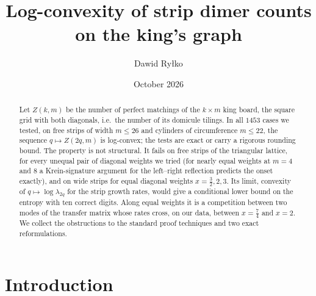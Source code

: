 \documentclass[11pt]{amsart}
\title{Log-convexity of strip dimer counts on the king's graph}
\author{Dawid Ry\l{}ko}
\date{October 2026}
\theoremstyle{definition}
\theoremstyle{remark}
\begin{document}
\begin{abstract}
Let $Z(k, m)$ be the number of perfect matchings of the $k \times m$ king board, the square grid
with both diagonals, i.e.\ the number of its domicule tilings. In all $1453$ cases we tested, on free
strips of width $m \le 26$ and cylinders of circumference $m \le 22$, the sequence $q \mapsto Z(2q, m)$
is log-convex; the tests are exact or carry a rigorous rounding bound. The property is not
structural. It fails on free strips of the triangular lattice, for every unequal pair of diagonal
weights we tried (for nearly equal weights at $m = 4$ and $8$ a Krein-signature argument for the
left--right reflection predicts the onset exactly), and on wide strips for equal diagonal weights
$x = \frac32, 2, 3$. Its limit, convexity of
$q \mapsto \log\lambda_{2q}$ for the strip growth rates, would give a conditional lower bound on the
entropy with ten correct digits. Along equal weights it is a competition between two modes of the
transfer matrix whose rates cross, on our data, between $x = \frac74$ and $x = 2$. We collect the obstructions to the
standard proof techniques and two exact reformulations.
\end{abstract}

\maketitle

\section{Introduction}
\end{document}
